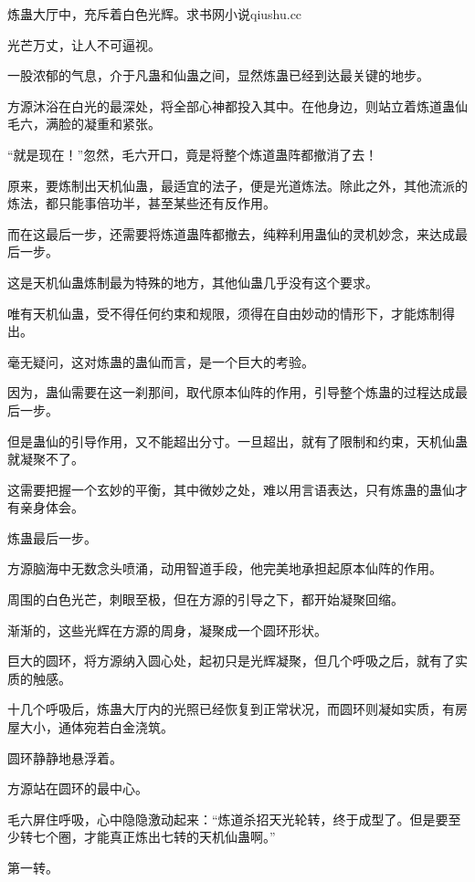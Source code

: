 
\begin{this_body}

炼蛊大厅中，充斥着白色光辉。求书网小说qiushu.cc

光芒万丈，让人不可逼视。

一股浓郁的气息，介于凡蛊和仙蛊之间，显然炼蛊已经到达最关键的地步。

方源沐浴在白光的最深处，将全部心神都投入其中。在他身边，则站立着炼道蛊仙毛六，满脸的凝重和紧张。

“就是现在！”忽然，毛六开口，竟是将整个炼道蛊阵都撤消了去！

原来，要炼制出天机仙蛊，最适宜的法子，便是光道炼法。除此之外，其他流派的炼法，都只能事倍功半，甚至某些还有反作用。

而在这最后一步，还需要将炼道蛊阵都撤去，纯粹利用蛊仙的灵机妙念，来达成最后一步。

这是天机仙蛊炼制最为特殊的地方，其他仙蛊几乎没有这个要求。

唯有天机仙蛊，受不得任何约束和规限，须得在自由妙动的情形下，才能炼制得出。

毫无疑问，这对炼蛊的蛊仙而言，是一个巨大的考验。

因为，蛊仙需要在这一刹那间，取代原本仙阵的作用，引导整个炼蛊的过程达成最后一步。

但是蛊仙的引导作用，又不能超出分寸。一旦超出，就有了限制和约束，天机仙蛊就凝聚不了。

这需要把握一个玄妙的平衡，其中微妙之处，难以用言语表达，只有炼蛊的蛊仙才有亲身体会。

炼蛊最后一步。

方源脑海中无数念头喷涌，动用智道手段，他完美地承担起原本仙阵的作用。

周围的白色光芒，刺眼至极，但在方源的引导之下，都开始凝聚回缩。

渐渐的，这些光辉在方源的周身，凝聚成一个圆环形状。

巨大的圆环，将方源纳入圆心处，起初只是光辉凝聚，但几个呼吸之后，就有了实质的触感。

十几个呼吸后，炼蛊大厅内的光照已经恢复到正常状况，而圆环则凝如实质，有房屋大小，通体宛若白金浇筑。

圆环静静地悬浮着。

方源站在圆环的最中心。

毛六屏住呼吸，心中隐隐激动起来：“炼道杀招天光轮转，终于成型了。但是要至少转七个圈，才能真正炼出七转的天机仙蛊啊。”

第一转。


\end{this_body}

